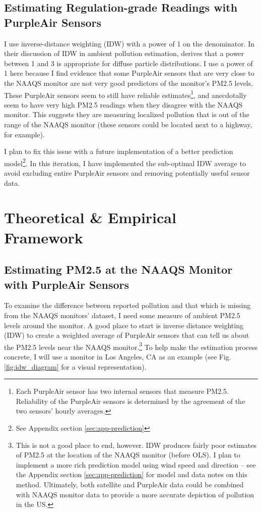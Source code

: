 \documentclass[12pt]{article}
\begin{document}
\subsection{Estimating Regulation-grade Readings with PurpleAir Sensors} 
I use inverse-distance weighting (IDW) with a power of 1 on the denominator. In their discussion of IDW in ambient pollution estimation, \cite{demesnardPollutionModelsInverse2013} derives that a power between 1 and 3 is appropriate for diffuse particle distributions. I use a power of 1 here because I find evidence that some PurpleAir sensors that are very close to the NAAQS monitor are not very good predictors of the monitor's PM2.5 levels. These PurpleAir sensors seem to still have reliable estimates\footnote{Each PurpleAir sensor has two internal sensors that measure PM2.5. Reliability of the PurpleAir sensors is determined by the agreement of the two sensors' hourly averages.}, and anecdotally seem to have very high PM2.5 readings when they disagree with the NAAQS monitor. This suggests they are measuring localized pollution that is out of the range of the NAAQS monitor (these sensors could be located next to a highway, for example).

I plan to fix this issue with a future implementation of a better prediction model\footnote{See Appendix section \ref{sec:app-prediction}}. In this iteration, I have implemented the sub-optimal IDW average to avoid excluding entire PurpleAir sensors and removing potentially useful sensor data.









\section{Theoretical \& Empirical Framework} 
\label{theoretical}

\subsection{Estimating PM2.5 at the NAAQS Monitor with PurpleAir Sensors}
\FloatBarrier

To examine the difference between reported pollution and that which is missing from the NAAQS monitors' dataset, I need some measure of ambient PM2.5 levels around the monitor. A good place to start is inverse distance weighting (IDW) to create a weighted average of PurpleAir sensors that can tell us about the PM2.5 levels near the NAAQS monitor.\footnote{This is not a good place to end, however. IDW produces fairly poor estimates of PM2.5 at the location of the NAAQS monitor (before OLS). I plan to implement a more rich prediction model using wind speed and direction -- see the Appendix section \ref{sec:app-prediction} for model and data notes on this method. Ultimately, both satellite and PurpleAir data could be combined with NAAQS monitor data to provide a more accurate depiction of pollution in the US.} To help make the estimation process concrete, I will use a monitor in Los Angeles, CA as an example (see Fig. \ref{fig:idw_diagram} for a visual representation).
\end{document}
